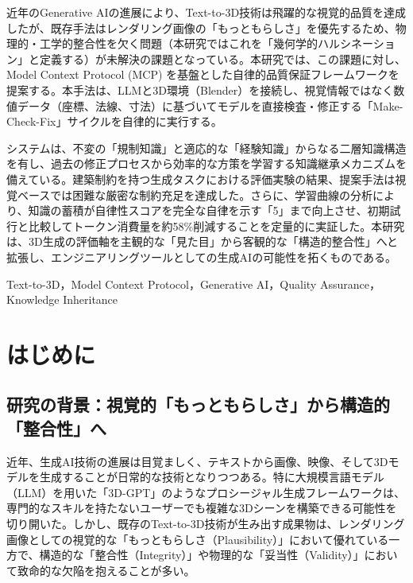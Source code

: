 \documentclass{deimj}
\begin{document}
\pagestyle{empty}

\begin{jabstract}
近年のGenerative AIの進展により、Text-to-3D技術は飛躍的な視覚的品質を達成したが、既存手法はレンダリング画像の「もっともらしさ」を優先するため、物理的・工学的整合性を欠く問題（本研究ではこれを「幾何学的ハルシネーション」と定義する）が未解決の課題となっている。本研究では、この課題に対し、Model Context Protocol (MCP) を基盤とした自律的品質保証フレームワークを提案する。本手法は、LLMと3D環境（Blender）を接続し、視覚情報ではなく数値データ（座標、法線、寸法）に基づいてモデルを直接検査・修正する「Make-Check-Fix」サイクルを自律的に実行する。

システムは、不変の「規制知識」と適応的な「経験知識」からなる二層知識構造を有し、過去の修正プロセスから効率的な方策を学習する知識継承メカニズムを備えている。建築制約を持つ生成タスクにおける評価実験の結果、提案手法は視覚ベースでは困難な厳密な制約充足を達成した。さらに、学習曲線の分析により、知識の蓄積が自律性スコアを完全な自律を示す「5」まで向上させ、初期試行と比較してトークン消費量を約58\%削減することを定量的に実証した。本研究は、3D生成の評価軸を主観的な「見た目」から客観的な「構造的整合性」へと拡張し、エンジニアリングツールとしての生成AIの可能性を拓くものである。
\end{jabstract}

\begin{jkeyword}
Text-to-3D，Model Context Protocol，Generative AI，Quality Assurance，Knowledge Inheritance
\end{jkeyword}

\maketitle

\section{はじめに}

\subsection{研究の背景：視覚的「もっともらしさ」から構造的「整合性」へ}

近年、生成AI技術の進展は目覚ましく、テキストから画像、映像、そして3Dモデルを生成することが日常的な技術となりつつある。特に大規模言語モデル（LLM）を用いた「3D-GPT」\cite{sun20233dgpt}のようなプロシージャル生成フレームワークは、専門的なスキルを持たないユーザーでも複雑な3Dシーンを構築できる可能性を切り開いた。しかし、既存のText-to-3D技術が生み出す成果物は、レンダリング画像としての視覚的な「もっともらしさ（Plausibility）」において優れている一方で、構造的な「整合性（Integrity）」や物理的な「妥当性（Validity）」において致命的な欠陥を抱えることが多い。
\end{document}
